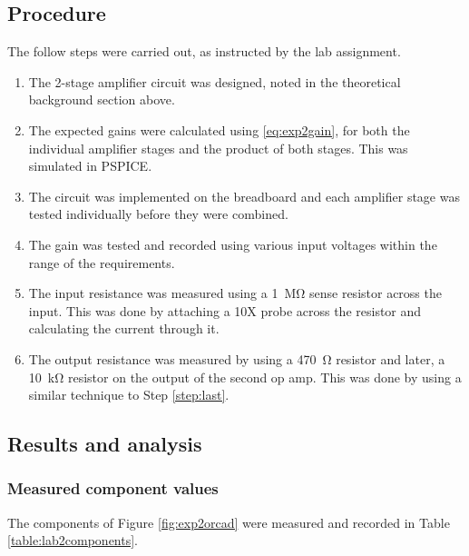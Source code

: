 \documentclass{report}
\begin{document}
	
	\subsection{Procedure}
	The follow steps were carried out, as instructed by the lab assignment.
	
	\begin{enumerate}
		\item The 2-stage amplifier circuit was designed, noted in the theoretical background section above. 
		\item The expected gains were calculated using \eqref{eq:exp2gain}, for both the individual amplifier stages and the product of both stages. This was simulated in PSPICE.
		\item The circuit was implemented on the breadboard and each amplifier stage was tested individually before they were combined.
		\item The gain was tested and recorded using various input voltages within the range of the requirements.
		\item The input resistance was measured using a \SI{1}{\Mohm} sense resistor across the input. This was done by attaching a 10X probe across the resistor and calculating the current through it. \label{step:last}
		\item The output resistance was measured by using a \SI{470}{\ohm} resistor and later, a \SI{10}{\kohm} resistor on the output of the second op amp. This was done by using a similar technique to Step \ref{step:last}.
	\end{enumerate}

	\pagebreak
	\subsection{Results and analysis}
	
	\subsubsection{Measured component values}
	The components of Figure \ref{fig:exp2orcad} were measured and recorded in Table \ref{table:lab2components}.
	
\end{document}

